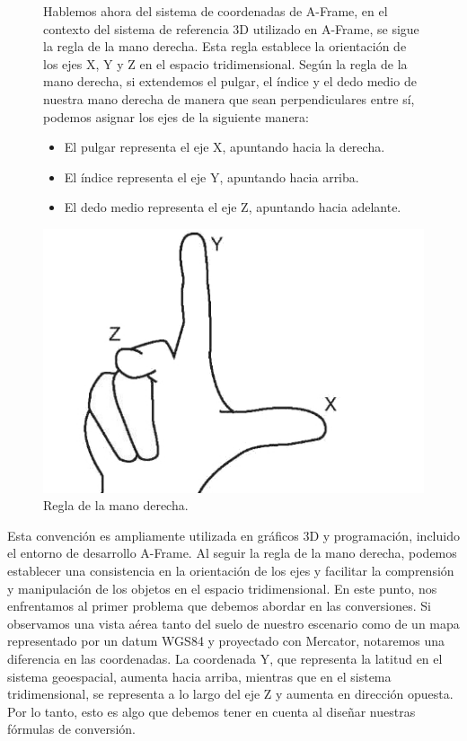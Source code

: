 \documentclass[a4paper, 11pt]{book}
\begin{document}
\begin{figure}[h]
\begin{minipage}{0.7\textwidth}
Hablemos ahora del sistema de coordenadas de A-Frame, en el contexto del sistema de referencia 3D utilizado en A-Frame, se sigue la regla de la mano derecha. Esta regla establece la orientación de los ejes X, Y y Z en el espacio tridimensional.
Según la regla de la mano derecha, si extendemos el pulgar, el índice y el dedo medio de nuestra mano derecha de manera que sean perpendiculares entre sí, podemos asignar los ejes de la siguiente manera:
\begin{itemize}
    \item El pulgar representa el eje X, apuntando hacia la derecha.
    \item El índice representa el eje Y, apuntando hacia arriba.
    \item El dedo medio representa el eje Z, apuntando hacia adelante.
    
\end{itemize}
\end{minipage}
\hfill
\begin{minipage}{0.25\textwidth}
\includegraphics[width=\textwidth]{img/rightHand.jpg}
\caption{Regla de la mano derecha.}
\label{fig:rightHand}
\end{minipage}
\end{figure}


Esta convención es ampliamente utilizada en gráficos 3D y programación, incluido el entorno de desarrollo A-Frame. Al seguir la regla de la mano derecha, podemos establecer una consistencia en la orientación de los ejes y facilitar la comprensión y manipulación de los objetos en el espacio tridimensional.
En este punto, nos enfrentamos al primer problema que debemos abordar en las conversiones. Si observamos una vista aérea tanto del suelo de nuestro escenario como de un mapa representado por un datum WGS84 y proyectado con Mercator, notaremos una diferencia en las coordenadas.
La coordenada Y, que representa la latitud en el sistema geoespacial, aumenta hacia arriba, mientras que en el sistema tridimensional, se representa a lo largo del eje Z y aumenta en dirección opuesta. Por lo tanto, esto es algo que debemos tener en cuenta al diseñar nuestras fórmulas de conversión.
\end{document}
